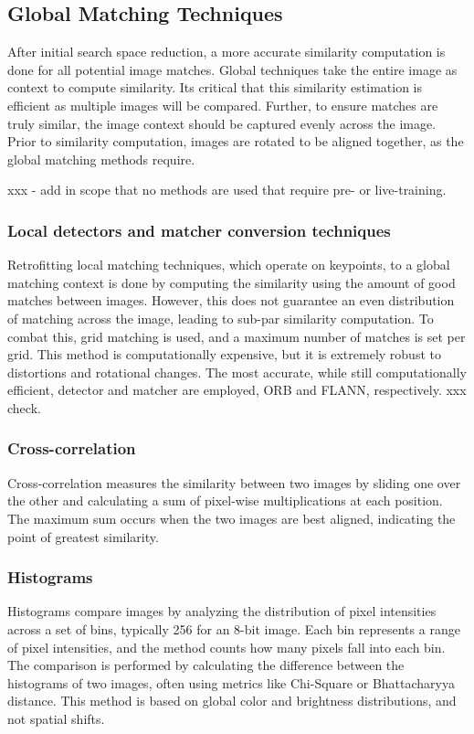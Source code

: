 \subsection*{Global Matching Techniques}

After initial search space reduction, a more accurate similarity computation is done for all potential image matches. Global techniques take the entire image as context to compute similarity. Its critical that this similarity estimation is efficient as multiple images will be compared. Further, to ensure matches are truly similar, the image context should be captured evenly across the image. 
Prior to similarity computation, images are rotated to be aligned together, as the global matching methods require. 


xxx - add in scope that no methods are used that require pre- or live-training.




\subsubsection*{Local detectors and matcher conversion techniques}
Retrofitting local matching techniques, which operate on keypoints, to a global matching context is done by computing the similarity using the amount of good matches between images. 
However, this does not guarantee an even distribution of matching across the image, leading to sub-par similarity computation. 
To combat this, grid matching is used, and a maximum number of matches is set per grid. This method is computationally expensive, but it is extremely robust to distortions and rotational changes. 
The most accurate, while still computationally efficient, detector and matcher are employed, ORB and FLANN, respectively. xxx check.


\subsubsection*{Cross-correlation}  
Cross-correlation measures the similarity between two images by sliding one over the other and calculating a sum of pixel-wise multiplications at each position. The maximum sum occurs when the two images are best aligned, indicating the point of greatest similarity. 

\subsubsection*{Histograms}  
Histograms compare images by analyzing the distribution of pixel intensities across a set of bins, typically 256 for an 8-bit image. Each bin represents a range of pixel intensities, and the method counts how many pixels fall into each bin. The comparison is performed by calculating the difference between the histograms of two images, often using metrics like Chi-Square or Bhattacharyya distance. This method is based on global color and brightness distributions, and not spatial shifts. 

